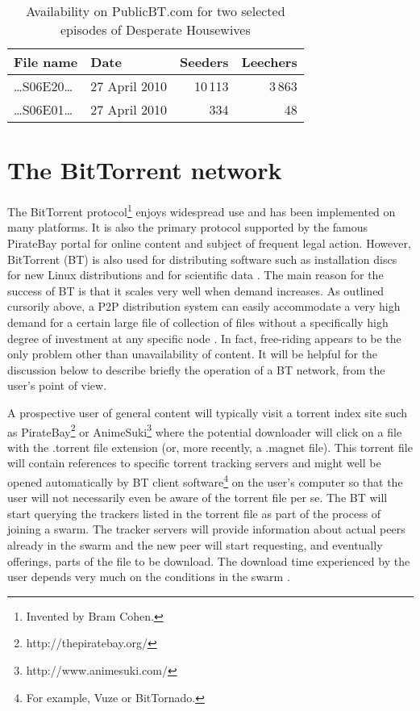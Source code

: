 \documentclass[12pt,english]{apa6}
\providecommand{\tabularnewline}{\\}
\begin{document}
\begin{table}
\caption{\label{tab:Availability-on-PublicBT.com}Availability on PublicBT.com
for two selected episodes of Desperate Housewives}
\small
\begin{centering}
\begin{tabular}{|llrr|}
\hline
File name & Date & Seeders & Leechers\tabularnewline[\doublerulesep]
\hline 
\ldots{}S06E20\ldots{} & 27 April 2010& 10\,113 & 3\,863\tabularnewline
\ldots{}S06E01\ldots{} & 27 April 2010& 334 & 48\tabularnewline
\hline 
\end{tabular}
\end{centering}
\end{table}



\section{The BitTorrent network}

The BitTorrent protocol\footnote{Invented by Bram Cohen.} enjoys widespread use and has been implemented on many platforms.
It is also the primary protocol supported by the famous PirateBay
portal for online content and subject of frequent legal action.‭ However,
BitTorrent (BT) is also used for distributing software such as installation
discs for new Linux distributions and for scientific data \citep{langille_biotorrents:file_2010}.
The main reason for the success of BT is that it scales very well
when demand increases. As outlined cursorily above, a P2P distribution
system can easily accommodate a very high demand for a certain large
file of collection of files without a specifically high degree of
investment at any specific node \citep{izal_dissecting_2004}. In
fact, free-riding appears to be the only problem other than unavailability
of content. It will be helpful for the discussion below to describe
briefly the operation of a BT network, from the user's point of view.

A prospective user of general content will typically visit a torrent
index site such as PirateBay\footnote{http://thepiratebay.org/} or AnimeSuki\footnote{http://www.animesuki.com/} where the potential downloader will click on a file with the .torrent
file extension (or, more recently, a .magnet file). This torrent file
will contain references to specific torrent tracking servers and might
well be opened automatically by BT client software\footnote{For example, Vuze or BitTornado.} on the user's computer so that the user will not necessarily even
be aware of the torrent file per se. The BT will start querying the
trackers listed in the torrent file as part of the process of joining
a swarm. The tracker servers will provide information about actual
peers already in the swarm and the new peer will start requesting,
and eventually offerings, parts of the file to be download. The download
time experienced by the user depends very much on the conditions in
the swarm \citep{chiu_minimizing_2008}.
\end{document}
